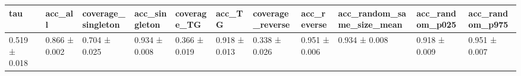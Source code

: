 \begin{tabular}{lllllllllll}
\toprule
tau & acc_all & coverage_singleton & acc_singleton & coverage_TG & acc_TG & coverage_reverse & acc_reverse & acc_random_same_size_mean & acc_random_p025 & acc_random_p975 \\
\midrule
0.519 ± 0.018 & 0.866 ± 0.002 & 0.704 ± 0.025 & 0.934 ± 0.008 & 0.366 ± 0.019 & 0.918 ± 0.013 & 0.338 ± 0.026 & 0.951 ± 0.006 & 0.934 ± 0.008 & 0.918 ± 0.009 & 0.951 ± 0.007 \\
\bottomrule
\end{tabular}
